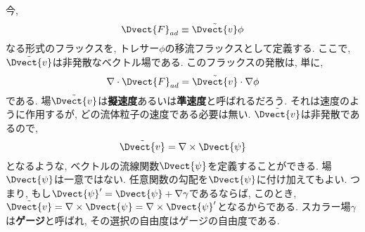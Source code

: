 今, 
\begin{equation}
  \Dvect{F}_{ad} \equiv \tilde{\Dvect{v}} \phi
\end{equation}
なる形式のフラックスを, トレサー$\phi$の移流フラックスとして定義する. 
ここで, $\tilde{\Dvect{v}}$は非発散なベクトル場である. 
このフラックスの発散は, 単に, 
\begin{equation}
  \nabla \cdot \Dvect{F}_{ad} = \tilde{\Dvect{v}} \cdot \nabla \phi
\end{equation}
である. 
場$\tilde{\Dvect{v}}$は\textbf{擬速度}あるいは\textbf{準速度}と呼ばれるだろう. 
それは速度のように作用するが, どの流体粒子の速度である必要は無い. 
$\tilde{\Dvect{v}}$は非発散であるので, 
\begin{equation}
 \tilde{\Dvect{v}} = \nabla \times \Dvect{\psi}
\end{equation}
となるような, ベクトルの流線関数$\Dvect{\psi}$を定義することができる. 
場$\Dvect{\psi}$は一意ではない. 
任意関数の勾配を$\Dvect{\psi}$に付け加えてもよい. 
つまり, もし$\Dvect{\psi}' = \Dvect{\psi} + \nabla \gamma$であるならば, 
このとき, $\tilde{\Dvect{v}}=\nabla \times \Dvect{\psi} = \nabla \times \Dvect{\psi}'$となるからである.
スカラー場$\gamma$は\textbf{ゲージ}と呼ばれ, その選択の自由度はゲージの自由度である. 

